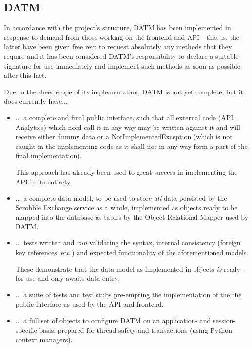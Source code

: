 \documentclass[a4paper,10pt,twoside]{article}
\begin{document}
\subsection{DATM}

In accordance with the project's structure, DATM has been implemented in response to demand from those working on the frontend and API - that is, the latter have been given free rein to request absolutely any methods that they require and it has been considered DATM's responsibility to declare a suitable signature for use immediately and implement such methods as soon as possible after this fact.

Due to the sheer scope of its implementation, DATM is not yet complete, but it does currently have...

\begin{itemize}
    \item ... a complete and final public interface, such that all external code (API, Analytics) which need call it in any way may be written against it and will receive either dummy data or a NotImplementedException (which is not caught in the implementing code as it shall not in any way form a part of the final implementation).
        
        This approach has already been used to great success in implementing the API in its entirety.
    
    \item ... a complete data model, to be used to store \emph{all} data persisted by the Scrobble Exchange service as a whole, implemented as objects ready to be mapped into the database as tables by the Object-Relational Mapper used by DATM.
    
    \item ... tests written and \emph{run} validating the syntax, internal consistency (foreign key references, etc.) and expected functionality of the aforementioned models.
    
        These demonstrate that the data model as implemented in objects \emph{is} ready-for-use and only awaits data entry.
        
    \item ... a suite of tests and test stubs pre-empting the implementation of the the public interface as used by the API and frontend.
    
    \item ... a full set of objects to configure DATM on an application- and session- specific basis, prepared for thread-safety and transactions (using Python context managers).
\end{itemize}
\end{document}
